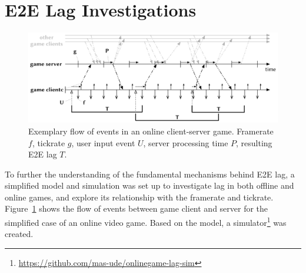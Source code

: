 \section{\gls{E2E} Lag Investigations}
\label{sec:model}

\begin{figure}[!t]
	\centering
	\includegraphics[width=1.0\columnwidth]{../../models/tickrate-timeseries-notation.pdf}
	\caption{Exemplary flow of events in an online client-server game. Framerate $f$, tickrate $g$, user input event $U$, server processing time $P$, resulting \gls{E2E} lag $T$. 
	}
\label{fig:tickrate-timeseries}
\end{figure}

To further the understanding of the fundamental mechanisms behind \gls{E2E} lag, a simplified model and simulation was set up to investigate lag in both offline and online games, and explore its relationship with the framerate and tickrate. Figure~\ref{fig:tickrate-timeseries} shows the flow of events between game client and server for the simplified case of an online video game. %
Based on the model, a simulator\footnote{\url{https://github.com/mas-ude/onlinegame-lag-sim}} was created.

